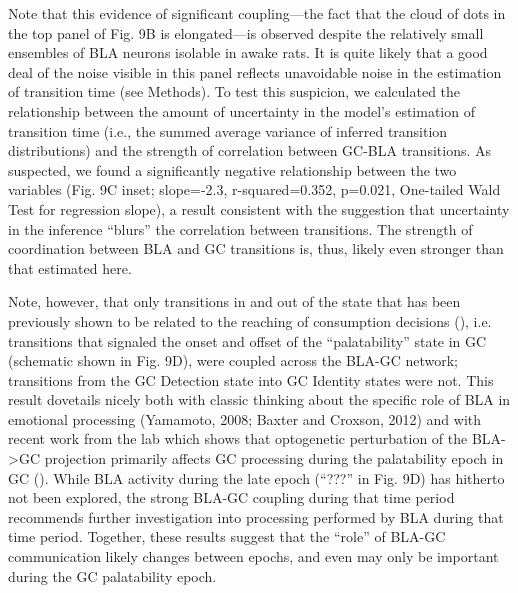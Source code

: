 \begin{refsection}
Note that this evidence of significant coupling—the fact that the cloud of dots in the top panel of Fig. 9B is elongated—is observed despite the relatively small ensembles of BLA neurons isolable in awake rats. It is quite likely that a good deal of the noise visible in this panel reflects unavoidable noise in the estimation of transition time (see Methods). To test this suspicion, we calculated the relationship between the amount of uncertainty in the model’s estimation of transition time (i.e., the summed average variance of inferred transition distributions) and the strength of correlation between GC-BLA transitions. As suspected, we found a significantly negative relationship between the two variables (Fig. 9C inset; slope=-2.3, r-squared=0.352, p=0.021, One-tailed Wald Test for regression slope), a result consistent with the suggestion that uncertainty in the inference “blurs” the correlation between transitions. The strength of coordination between BLA and GC transitions is, thus, likely even stronger than that estimated here.

Note, however, that only transitions in and out of the state that has been previously shown to be related to the reaching of consumption decisions (\cite{sadacca2016a}), i.e. transitions that signaled the onset and offset of the “palatability” state in GC (schematic shown in Fig. 9D), were coupled across the BLA-GC network; transitions from the GC Detection state into GC Identity states were not. This result dovetails nicely both with classic thinking about the specific role of BLA in emotional processing (Yamamoto, 2008; Baxter and Croxson, 2012) and with recent work from the lab which shows that optogenetic perturbation of the BLA->GC projection primarily affects GC processing during the palatability epoch in GC (\cite{lin2021a}). While BLA activity during the late epoch (“???” in Fig. 9D) has hitherto not been explored, the strong BLA-GC coupling during that time period recommends further investigation into processing performed by BLA during that time period. Together, these results suggest that the “role” of BLA-GC communication likely changes between epochs, and even may only be important during the GC palatability epoch.


\end{refsection}
